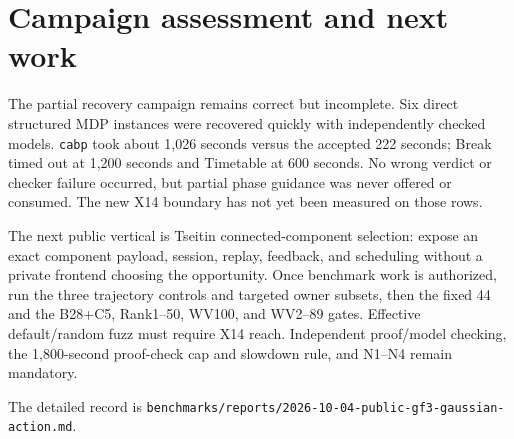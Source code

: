 \documentclass[11pt]{article}
\newcommand{\code}[1]{\texttt{#1}}
\begin{document}
\section*{Campaign assessment and next work}

The partial recovery campaign remains correct but incomplete. Six direct
structured MDP instances were recovered quickly with independently checked
models. \code{cabp} took about 1,026 seconds versus the accepted 222 seconds;
Break timed out at 1,200 seconds and Timetable at 600 seconds. No wrong verdict
or checker failure occurred, but partial phase guidance was never offered or
consumed. The new X14 boundary has not yet been measured on those rows.

The next public vertical is Tseitin connected-component selection: expose an
exact component payload, session, replay, feedback, and scheduling without a
private frontend choosing the opportunity. Once benchmark work is authorized,
run the three trajectory controls and targeted owner subsets, then the fixed 44
and the B28+C5, Rank1--50, WV100, and WV2--89 gates. Effective default/random
fuzz must require X14 reach. Independent proof/model checking, the 1,800-second
proof-check cap and slowdown rule, and N1--N4 remain mandatory.

The detailed record is
\code{benchmarks/reports/2026-10-04-public-gf3-gaussian-action.md}.
\end{document}
